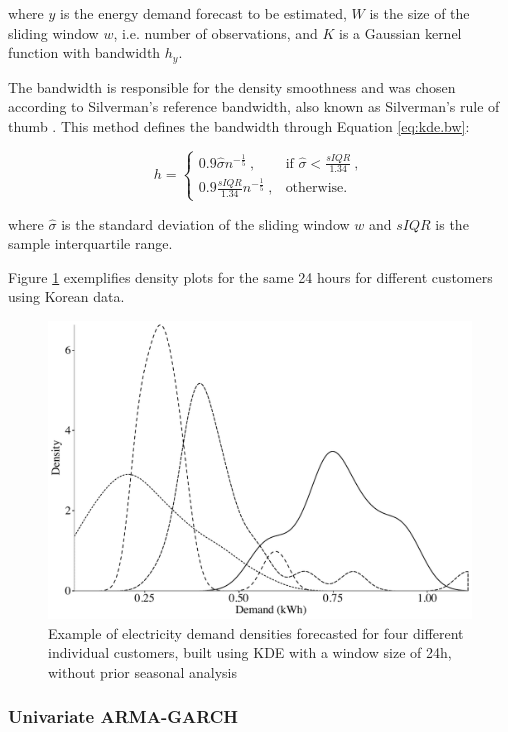 \documentclass[preprint,3p,12pt,authoryear]{elsarticle}
\begin{document}
where $y$ is the energy demand forecast to be estimated, $W$ is the size of the sliding window $w$, i.e. number of observations, and $K$ is a Gaussian kernel function with bandwidth $h_y$.

The bandwidth is responsible for the density smoothness and was chosen according to Silverman’s reference bandwidth, also known as Silverman’s rule of thumb \citep{silverman1986density}.
This method defines the bandwidth through Equation \ref{eq:kde.bw}:

\begin{equation}
   h = \begin{cases}
      0.9 \hat \sigma n^{-\frac{1}{5}}\ , & \text{if $\hat \sigma<\frac{sIQR}{1.34}$}\ , \\
      0.9 \frac{sIQR}{1.34} n^{-\frac{1}{5}}\ , & \text{otherwise}.
    \end{cases}
   \label{eq:kde.bw}
\end{equation}

where $\hat \sigma$ is the standard deviation of the sliding window $w$ and $sIQR$ is the sample interquartile range.

Figure \ref{fig:dens.cus} exemplifies density plots for the same 24 hours for different customers using Korean data.
\begin{figure}
  \centering
  \includegraphics[width=0.8\columnwidth]{2017-10-13_compare_fulldensities_KO2}
  \caption{Example of electricity demand densities forecasted for four different individual customers, built using KDE with a window size of 24h, without prior seasonal analysis}
  \label{fig:dens.cus}
\end{figure}

\subsubsection{Univariate ARMA-GARCH}
\label{sss:arma-garch}
\end{document}
